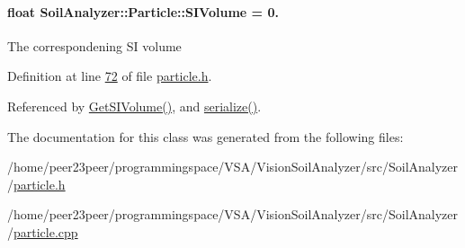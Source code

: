 \paragraph[{S\+I\+Volume}]{\setlength{\rightskip}{0pt plus 5cm}float Soil\+Analyzer\+::\+Particle\+::\+S\+I\+Volume = 0.\hspace{0.3cm}{\ttfamily [private]}}\label{class_soil_analyzer_1_1_particle_a62edcdac484d0822a098ac58b9927150}
The correspondening S\+I volume 

Definition at line \hyperlink{particle_8h_source_l00072}{72} of file \hyperlink{particle_8h_source}{particle.\+h}.



Referenced by \hyperlink{particle_8cpp_source_l00057}{Get\+S\+I\+Volume()}, and \hyperlink{particle_8h_source_l00083}{serialize()}.



The documentation for this class was generated from the following files\+:\begin{DoxyCompactItemize}
\item 
/home/peer23peer/programmingspace/\+V\+S\+A/\+Vision\+Soil\+Analyzer/src/\+Soil\+Analyzer/\hyperlink{particle_8h}{particle.\+h}\item 
/home/peer23peer/programmingspace/\+V\+S\+A/\+Vision\+Soil\+Analyzer/src/\+Soil\+Analyzer/\hyperlink{particle_8cpp}{particle.\+cpp}\end{DoxyCompactItemize}
